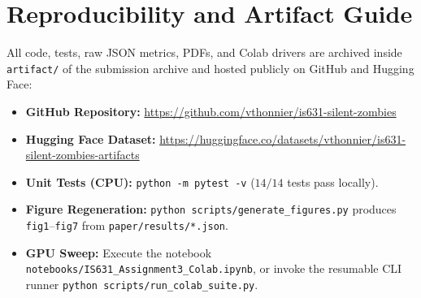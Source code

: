 \documentclass[11pt]{article}
\begin{document}
\section{Reproducibility and Artifact Guide}
All code, tests, raw JSON metrics, PDFs, and Colab drivers are archived inside \texttt{artifact/} of the submission archive and hosted publicly on GitHub and Hugging Face:
\begin{itemize}
  \item \textbf{GitHub Repository:} \url{https://github.com/vthonnier/is631-silent-zombies}
  \item \textbf{Hugging Face Dataset:} \url{https://huggingface.co/datasets/vthonnier/is631-silent-zombies-artifacts}
  \item \textbf{Unit Tests (CPU):} \texttt{python -m pytest -v} ($14/14$ tests pass locally).
  \item \textbf{Figure Regeneration:} \texttt{python scripts/generate\_figures.py} produces \texttt{fig1}--\texttt{fig7} from \texttt{paper/results/*.json}.
  \item \textbf{GPU Sweep:} Execute the notebook \texttt{notebooks/IS631\_Assignment3\_Colab.ipynb}, or invoke the resumable CLI runner \texttt{python scripts/run\_colab\_suite.py}.
\end{itemize}
\end{document}
